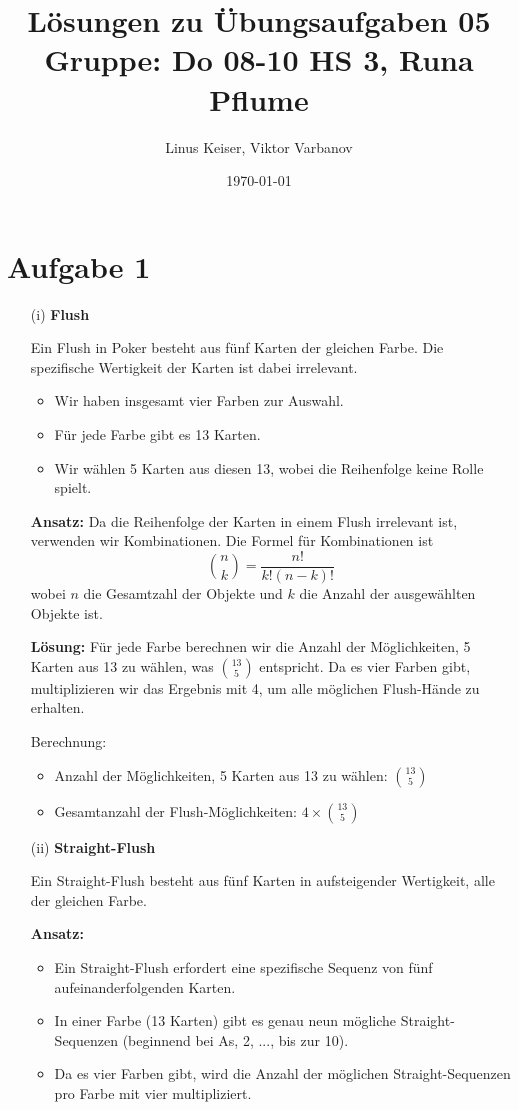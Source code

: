\documentclass{article}
\title{Lösungen zu Übungsaufgaben 05 \\ \small Gruppe: Do 08-10 HS 3, Runa Pflume}
\author{Linus Keiser, Viktor Varbanov}
\date{\today}
\begin{document}
\maketitle


\section*{Aufgabe 1}

\begin{enumerate}
	\item[(i)] \textbf{Flush}

		Ein Flush in Poker besteht aus fünf Karten der gleichen Farbe. Die spezifische Wertigkeit der Karten ist dabei irrelevant.

		\begin{itemize}
			\item Wir haben insgesamt vier Farben zur Auswahl.
			\item Für jede Farbe gibt es 13 Karten.
			\item Wir wählen 5 Karten aus diesen 13, wobei die Reihenfolge keine Rolle spielt.
		\end{itemize}

		\textbf{Ansatz:}
		Da die Reihenfolge der Karten in einem Flush irrelevant ist, verwenden wir Kombinationen. Die Formel für Kombinationen ist
		\[
			\binom{n}{k} = \frac{n!}{k!(n-k)!}
		\]
		wobei \( n \) die Gesamtzahl der Objekte und \( k \) die Anzahl der ausgewählten Objekte ist.

		\textbf{Lösung:}
		Für jede Farbe berechnen wir die Anzahl der Möglichkeiten, 5 Karten aus 13 zu wählen, was \( \binom{13}{5} \) entspricht. Da es vier Farben gibt, multiplizieren wir das Ergebnis mit 4, um alle möglichen Flush-Hände zu erhalten.

		Berechnung:
		\begin{itemize}
			\item Anzahl der Möglichkeiten, 5 Karten aus 13 zu wählen: \( \binom{13}{5} \)
			\item Gesamtanzahl der Flush-Möglichkeiten: \( 4 \times \binom{13}{5} \)
		\end{itemize}
	\item[(ii)] \textbf{Straight-Flush}

		Ein Straight-Flush besteht aus fünf Karten in aufsteigender Wertigkeit, alle der gleichen Farbe.

		\textbf{Ansatz:}
		\begin{itemize}
			\item Ein Straight-Flush erfordert eine spezifische Sequenz von fünf aufeinanderfolgenden Karten.
			\item In einer Farbe (13 Karten) gibt es genau neun mögliche Straight-Sequenzen (beginnend bei As, 2, ..., bis zur 10).
			\item Da es vier Farben gibt, wird die Anzahl der möglichen Straight-Sequenzen pro Farbe mit vier multipliziert.
		\end{itemize}


\end{enumerate}
\end{document}
